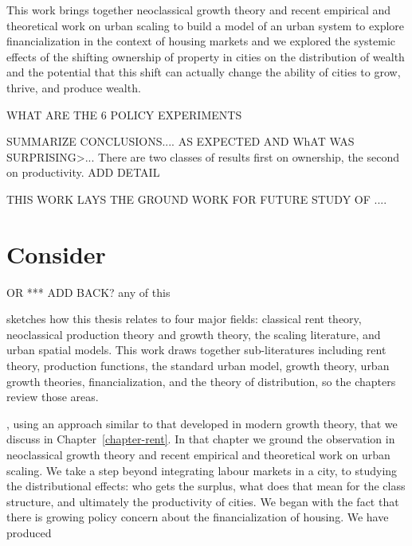 This work brings together \gls{neoclassical growth theory} and recent empirical and theoretical work on \gls{urban scaling} to build a model of an urban system to explore financialization in the context of housing markets and we explored the systemic effects of the shifting ownership of property in cities on the distribution of wealth and the potential that this shift can actually change the ability of cities to grow, thrive, and produce wealth.


WHAT ARE THE 6 POLICY EXPERIMENTS

SUMMARIZE CONCLUSIONS.... AS EXPECTED AND WhAT WAS SURPRISING>...
There are two classes of results first on ownership, the second on productivity. ADD DETAIL

THIS WORK LAYS THE GROUND WORK FOR FUTURE STUDY OF ....



\section{Consider}
OR *** ADD BACK? any of this


sketches how this thesis relates to four major fields: classical rent theory, neoclassical production theory and growth theory, the scaling literature, and urban spatial models. %
    This work draws together sub-literatures including rent theory, production functions, the standard urban model, growth theory, urban growth theories, financialization, and the theory of distribution, so the chapters review those areas. %

    , using an approach similar to that developed in modern growth theory, that we discuss in Chapter~\ref{chapter-rent}.  In that chapter we ground the observation in  \gls{neoclassical growth theory} and recent empirical and theoretical work on \gls{urban scaling}. 
 We take a step beyond integrating labour markets in a city, to studying the distributional effects: who gets the surplus, what does that mean for the class structure, and ultimately the productivity of cities. 
We began with the fact that there is growing policy concern about the financialization of  housing. We have produced 



